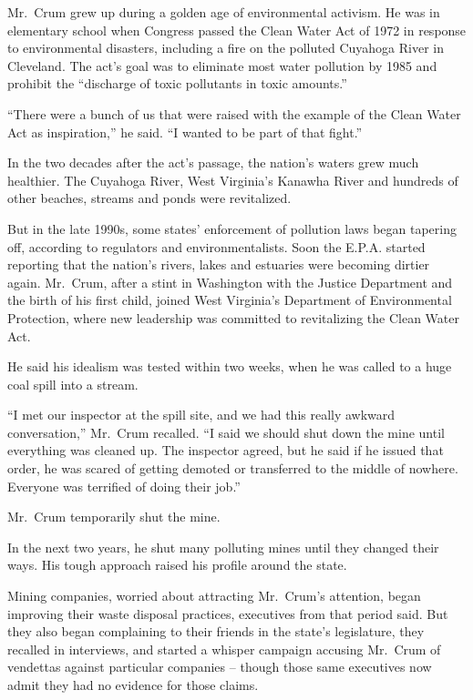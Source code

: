 ﻿\documentclass[12pt]{article}
\begin{document}
Mr.~Crum grew up during a golden age of environmental activism. He was in elementary school when
Congress passed the Clean Water Act of 1972 in response to environmental disasters, including a fire
on the polluted Cuyahoga River in Cleveland. The act's goal was to eliminate most water pollution by
1985 and prohibit the ``discharge of toxic pollutants in toxic amounts.''

``There were a bunch of us that were raised with the example of the Clean Water Act as
inspiration,'' he said. ``I wanted to be part of that fight.''

In the two decades after the act's passage, the nation's waters grew much healthier. The Cuyahoga
River, West Virginia's Kanawha River and hundreds of other beaches, streams and ponds were
revitalized.

But in the late 1990s, some states' enforcement of pollution laws began tapering off, according to
regulators and environmentalists. Soon the E.P.A. started reporting that the nation's rivers, lakes
and estuaries were becoming dirtier again. Mr.~Crum, after a stint\cite{stint} in Washington with
the Justice Department and the birth of his first child, joined West Virginia's Department of
Environmental Protection, where new leadership was committed to revitalizing the Clean Water Act.

He said his idealism was tested within two weeks, when he was called to a huge coal spill into a
stream.

``I met our inspector at the spill site, and we had this really awkward conversation,'' Mr.~Crum
recalled. ``I said we should shut down the mine until everything was cleaned up. The inspector
agreed, but he said if he issued that order, he was scared of getting demoted or transferred to the
middle of nowhere. Everyone was terrified of doing their job.''

Mr.~Crum temporarily shut the mine.

In the next two years, he shut many polluting mines until they changed their ways. His tough
approach raised his profile around the state.

Mining companies, worried about attracting Mr.~Crum's attention, began improving their waste
disposal practices, executives from that period said. But they also began complaining to their
friends in the state's legislature, they recalled in interviews, and started a whisper campaign
accusing Mr.~Crum of vendettas\cite{vendetta} against particular companies -- though those same
executives now admit they had no evidence for those claims.
\end{document}
